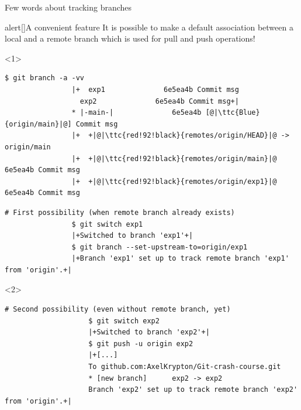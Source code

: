 \documentclass[usenames,svgnames,14pt]{beamer}
\newcommand{\ttc}[2]{\texttt{\textcolor{#1}{#2}}}%
\begin{document}
\begin{frame}[fragile]{Few words about tracking branches}
    \vspace{-8mm}
    \begin{overlayarea}{\textwidth}{0.85\textheight}
        \begin{varblock}{alert}[\textwidth]{A convenient feature}
            It is possible to make a default association between a local and a remote branch which is used for pull and push operations!
        \end{varblock}
        \begin{onlyenv}<1>
            \begin{lstlisting}[style=MyBash, xrightmargin=-1mm, xleftmargin=-1mm]
                $ git branch -a -vv
                |+  exp1              6e5ea4b Commit msg
                  exp2              6e5ea4b Commit msg+|
                * |-main-|              6e5ea4b [@|\ttc{Blue}{origin/main}|@] Commit msg
                |+  +|@|\ttc{red!92!black}{remotes/origin/HEAD}|@ -> origin/main
                |+  +|@|\ttc{red!92!black}{remotes/origin/main}|@ 6e5ea4b Commit msg
                |+  +|@|\ttc{red!92!black}{remotes/origin/exp1}|@ 6e5ea4b Commit msg
            \end{lstlisting}
            \begin{lstlisting}[style=MyBash, xrightmargin=-1mm, xleftmargin=-1mm]
                # First possibility (when remote branch already exists)
                $ git switch exp1
                |+Switched to branch 'exp1'+|
                $ git branch --set-upstream-to=origin/exp1
                |+Branch 'exp1' set up to track remote branch 'exp1' from 'origin'.+|
            \end{lstlisting}
        \end{onlyenv}
        \begin{overlayarea}{\textwidth}{0.35\textheight}
            \vspace{-2mm}
            \begin{onlyenv}<2>
                \begin{lstlisting}[style=MyBash, xrightmargin=-1mm, xleftmargin=-1mm]
                    # Second possibility (even without remote branch, yet)
                    $ git switch exp2
                    |+Switched to branch 'exp2'+|
                    $ git push -u origin exp2
                    |+[...]
                    To github.com:AxelKrypton/Git-crash-course.git
                    * [new branch]      exp2 -> exp2
                    Branch 'exp2' set up to track remote branch 'exp2' from 'origin'.+|

\end{lstlisting}
\end{onlyenv}
\end{overlayarea}
\end{overlayarea}
\end{frame}
\end{document}
